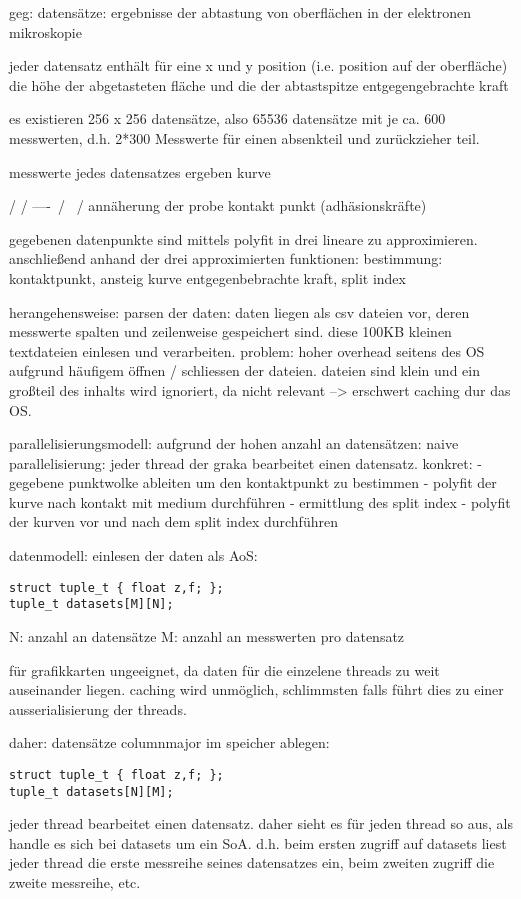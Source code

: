 geg: datensätze: ergebnisse der abtastung von oberflächen in der elektronen mikroskopie


jeder datensatz enthält für eine x und y position (i.e. position auf der oberfläche) die höhe der abgetasteten fläche und die der abtastspitze entgegengebrachte kraft

es existieren 256 x 256 datensätze, also 65536 datensätze mit je ca. 600 messwerten, d.h. 2*300 Messwerte für einen absenkteil und zurückzieher teil.

messwerte jedes datensatzes ergeben kurve

           /
          /
----\    /
     \  /
      \/
 annäherung der probe
       kontakt punkt (adhäsionskräfte)
         
gegebenen datenpunkte sind mittels polyfit  in drei lineare zu approximieren. anschließend anhand der drei approximierten funktionen: bestimmung: kontaktpunkt, ansteig kurve entgegenbebrachte kraft, split index

herangehensweise: 
parsen der daten:
daten liegen als csv dateien vor, deren messwerte spalten und zeilenweise gespeichert sind. diese 100KB kleinen textdateien einlesen und verarbeiten.
problem: hoher overhead seitens des OS aufgrund häufigem öffnen / schliessen der dateien. dateien sind klein und ein großteil des inhalts wird ignoriert, da nicht relevant --> erschwert caching dur das OS.

parallelisierungsmodell:
aufgrund der hohen anzahl an datensätzen: naive parallelisierung: jeder thread der graka bearbeitet einen datensatz. konkret:
- gegebene punktwolke ableiten um den kontaktpunkt zu bestimmen
- polyfit der kurve nach kontakt mit medium durchführen
- ermittlung des split index
- polyfit der kurven vor und nach dem split index durchführen

datenmodell:
einlesen der daten als AoS:

\begin{lstlisting}
struct tuple_t { float z,f; };
tuple_t datasets[M][N];
\end{lstlisting}

N: anzahl an datensätze
M: anzahl an messwerten pro datensatz

für grafikkarten ungeeignet, da daten für die einzelene threads zu weit auseinander liegen. caching wird unmöglich, schlimmsten falls führt dies zu einer ausserialisierung der threads.

daher: datensätze columnmajor im speicher ablegen:

\begin{lstlisting}
struct tuple_t { float z,f; };
tuple_t datasets[N][M];
\end{lstlisting}

jeder thread bearbeitet einen datensatz. daher sieht es für jeden thread so aus, als handle es sich bei datasets um ein SoA. d.h. beim ersten zugriff auf datasets liest jeder thread die erste messreihe seines datensatzes ein, beim zweiten zugriff die zweite messreihe, etc.

